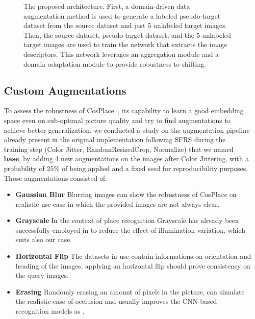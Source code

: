 \documentclass[10pt,twocolumn,letterpaper]{article}
\begin{document}
\begin{figure*}
  \centering
  \begin{subfigure}{1.0\linewidth}
    \centering
  
  \end{subfigure}
     \caption{The proposed architecture. First, a domain-driven data augmentation method is used to generate a labeled pseudo-target dataset from the source dataset and just 5 unlabeled target images. Then, the source dataset, pseudo-target dataset, and the 5 unlabeled target images are used to train the network that extracts the image descriptors. This network leverages an aggregation module and a domain adaptation module to provide robustness to shifting.}
    \label{fig:our_architecture}
  \hfill
\end{figure*}


\subsection{Custom Augmentations}
To assess the robustness of CosPlace~\cite{Berton_CVPR_2022_CosPlace}, its capability to learn a good embedding space even on sub-optimal picture quality and try to find augmentations to achieve better generalization,
we conducted a study on the augmentation pipeline already present in the original implementation following SFRS \cite{sfrs} during the training step (Color Jitter, RandomResizedCrop, Normalize) that we named \textbf{base}, by adding 4 new augmentations on the images after Color Jittering, with a probability of 25\% of being applied and a fixed seed for reproducibility purposes. Those augmentations consisted of:
\begin{itemize}
  \item \textbf{Gaussian Blur}\newline
Blurring images can show the robustness of CosPlace on realistic use case in which the provided images are not always clear.
  \item \textbf{Grayscale}\newline
  In the context of place recognition Grayscale has already been successfully employed in \cite{grayscalecnn} to reduce the effect of illumination variation, which suits also our case.
  \item \textbf{Horizontal Flip}\newline
The datasets in use contain informations on orientation and heading of the images, applying an horizontal flip should prove consistency on the query images. 
  \item \textbf{Erasing}\newline
Randomly erasing an amount of pixels in the picture, can simulate the realistic case of occlusion and usually improves the CNN-based recognition models as \cite{reda}.
\end{itemize}
\end{document}

